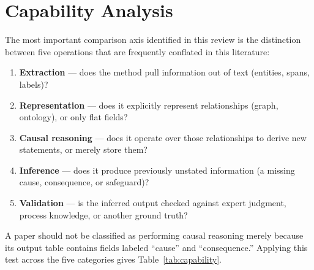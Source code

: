 \section{Capability Analysis}
The most important comparison axis identified in this review is the distinction between five operations that are frequently conflated in this literature:
\begin{enumerate}
  \item \textbf{Extraction} --- does the method pull information out of text (entities, spans, labels)?
  \item \textbf{Representation} --- does it explicitly represent relationships (graph, ontology), or only flat fields?
  \item \textbf{Causal reasoning} --- does it operate over those relationships to derive new statements, or merely store them?
  \item \textbf{Inference} --- does it produce previously unstated information (a missing cause, consequence, or safeguard)?
  \item \textbf{Validation} --- is the inferred output checked against expert judgment, process knowledge, or another ground truth?
\end{enumerate}
A paper should not be classified as performing causal reasoning merely because its output table contains fields labeled ``cause'' and ``consequence.'' Applying this test across the five categories gives Table~\ref{tab:capability}.

\begin{table}[htbp]
\centering
\caption[Capability matrix across the five literature categories]{Capability
matrix. \yes~= performed, \prt~= partial or method-dependent, \no~= not
performed. \emph{Validation} records whether validation was attempted, not
whether it succeeded --- Category E validates carefully and reports a poor
result. The last row is the profile this project would have to occupy to be
distinct; it is a target, not a result.}
\label{tab:capability}
\small
{}%
\end{table}

